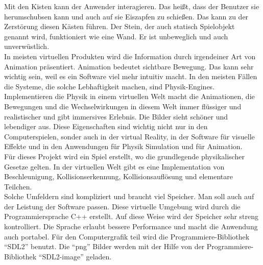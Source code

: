 \documentclass[
  10pt,
  a4paper,
  oneside,
  headers,
  headinclude,
  footinclude,
  BCOR5mm,
]{article}
\begin{document}
\justify
Mit den Kisten kann der Anwender interagieren. Das heißt, dass der Benutzer sie
herumschubsen kann und auch auf sie Eiszapfen zu schießen. Das kann zu der
Zerstörung diesen Kästen führen. Der Stein, der auch statisch Spielobjekt
genannt wird, funktioniert wie eine Wand. Er ist unbeweglich und auch
unverwüstlich. \\
In meisten virtuellen Produkten wird die Information durch irgendeiner Art von
Animation präsentiert. Animation bedeutet sichtbare Bewegung. Das kann sehr
wichtig sein, weil es ein Software viel mehr intuitiv macht. In den meisten
Fällen die Systeme, die solche Lebhaftigkeit machen, sind Physik-Engines. \\
Implementieren die Physik in einem virtuellen Welt macht die Animationen, die
Bewegungen und die Wechselwirkungen in diesem Welt immer flüssiger und
realistischer und gibt immersives Erlebnis. Die Bilder sieht schöner und
lebendiger aus. Diese Eigenschaften sind wichtig nicht nur in den
Computerspielen, sonder auch in der virtual Reality, in der Software für
visuelle Effekte und in den Anwendungen für Physik Simulation und für
Animation. \\
Für dieses Projekt wird ein Spiel erstellt, wo die grundlegende physikalischer
Gesetze gelten. In der virtuellen Welt gibt es eine Implementation von
Beschleunigung, Kollisionserkennung, Kollisionsauflösung und elementare
Teilchen. \\
Solche Umfeldern sind kompliziert und braucht viel Speicher. Man soll auch auf
der Leistung der Software passen. Diese virtuelle Umgebung wird durch die
Programmiersprache C++ erstellt. Auf diese Weise wird der Speicher sehr streng
kontrolliert. Die Sprache erlaubt bessere Performance und macht die Anwendung
auch portabel. Für den Computergrafik teil wird die Programmiere-Bibliothek
``SDL2'' benutzt. Die ``png'' Bilder werden mit der Hilfe von der
Programmiere-Bibliothek ``SDL2-image'' geladen.\\

\newpage
\end{document}
